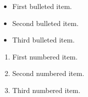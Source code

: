 \documentclass{article}
\begin{document}
\begin{itemize}
  \item First bulleted item.
  \item Second bulleted item.
  \item Third bulleted item.
\end{itemize}

\begin{enumerate}
  \item First numbered item.
  \item Second numbered item.
  \item Third numbered item.
\end{enumerate}
\end{document}
